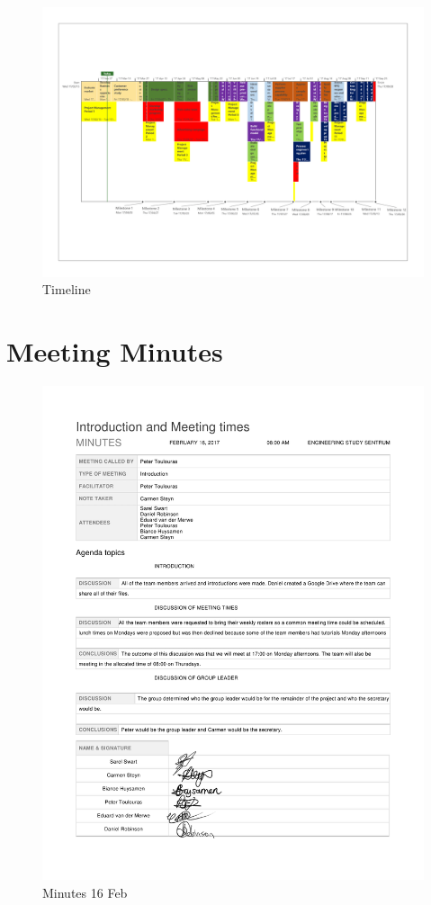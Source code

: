 \begin{appendices}
\begin{landscape}
\begin{figure}[H]
\centering
\includegraphics[scale=0.2433]{images/timeline.png}
\caption{Timeline}
\end{figure}

\end{landscape}

\restoregeometry

\section{Meeting Minutes}
\label{appendix:minutes}

\begin{figure}[H]
\centering
\includegraphics[scale=0.25]{Meeting_minutes_16_Feb.png}
\caption{Minutes 16 Feb}
\end{figure}


\end{appendices}
